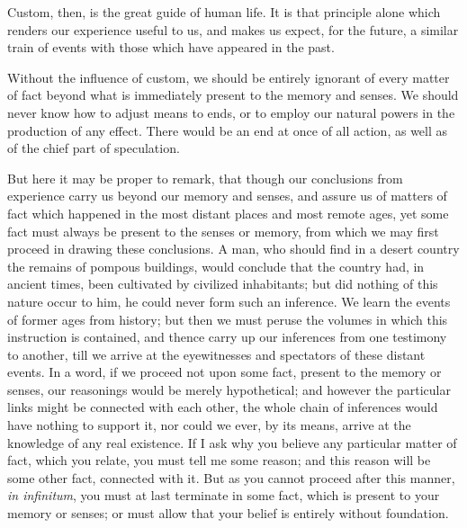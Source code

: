 \documentclass[]{article}
\begin{document}
\begin{sectionbody}
\humeparagraph  Custom, then, is the great guide of human life. It is that principle alone which renders our experience useful to us, and makes us expect, for the future, a similar train of events with those which have appeared in the past.

\humeparagraph  Without the influence of custom, we should be entirely ignorant of every matter of fact beyond what is immediately present to the memory and senses. We should never know how to adjust means to ends, or to employ our natural powers in the production of any effect. There would be an end at once of all action, as well as of the chief part of speculation.

\humeparagraph  But here it may be proper to remark, that though our conclusions from experience carry us beyond our memory and senses, and assure us of matters of fact which happened in the most distant places and most remote ages, yet some fact must always be present to the senses or memory, from which we may first proceed in drawing these conclusions. A man, who should find in a desert country the remains of pompous buildings, would conclude that the country had, in ancient times, been cultivated by civilized inhabitants; but did nothing of this nature occur to him, he could never form such an inference. We learn the events of former ages from history; but then we must peruse the volumes in which this instruction is contained, and thence carry up our inferences from one testimony to another, till we arrive at the eyewitnesses and spectators of these distant events. In a word, if we proceed not upon some fact, present to the memory or senses, our reasonings would be merely hypothetical; and however the particular links might be connected with each other, the whole chain of inferences would have nothing to support it, nor could we ever, by its means, arrive at the knowledge of any real existence. If I ask why you believe any particular matter of fact, which you relate, you must tell me some reason; and this reason will be some other fact, connected with it. But as you cannot proceed after this manner, \emph{in infinitum}, you must at last terminate in some fact, which is present to your memory or senses; or must allow that your belief is entirely without foundation.


\end{sectionbody}
\end{document}
